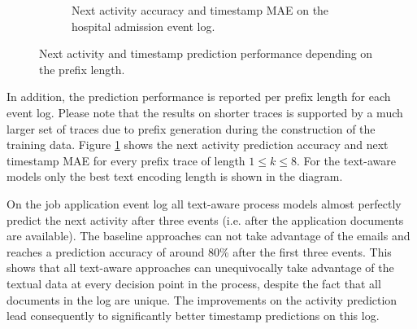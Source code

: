 \begin{figure}[!htbp]
\begin{subfigure}{\textwidth}
		\caption{Next activity accuracy and timestamp MAE on the hospital admission event log.}
	\end{subfigure}
	\caption[Next activity and timestamp prediction performance depending on the prefix length]{Next activity and timestamp prediction performance depending on the prefix length.}
	\label{fig:next-activity-prefix}
\end{figure}

In addition, the prediction performance is reported per prefix length for each event log.
Please note that the results on shorter traces is supported by a much larger set of traces due to prefix generation during the construction of the training data.
Figure \ref{fig:next-activity-prefix} shows the next activity prediction accuracy and next timestamp MAE for every prefix trace of length $1 \leq k \leq 8$.
For the text-aware models only the best text encoding length is shown in the diagram.

On the job application event log all text-aware process models almost perfectly predict the next activity after three events (i.e. after the application documents are available).
The baseline approaches can not take advantage of the emails and reaches a prediction accuracy of around 80\% after the first three events.
This shows that all text-aware approaches can unequivocally take advantage of the textual data at every decision point in the process, despite the fact that all documents in the log are unique.
The improvements on the activity prediction lead consequently to significantly better timestamp predictions on this log.

